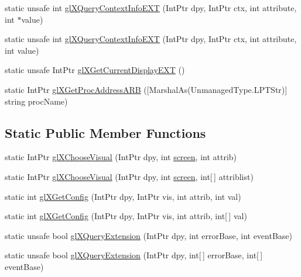 \begin{DoxyCompactItemize}
\item 
static unsafe int \hyperlink{class_tao_1_1_platform_1_1_x11_1_1_glx_ab41c548e80e5b611d2cb2cf574447384}{glXQueryContextInfoEXT} (IntPtr dpy, IntPtr ctx, int attribute, int $\ast$value)
\item 
static unsafe int \hyperlink{class_tao_1_1_platform_1_1_x11_1_1_glx_ab04a24929cd277bb67038a2908732831}{glXQueryContextInfoEXT} (IntPtr dpy, IntPtr ctx, int attribute, int value)
\item 
static unsafe IntPtr \hyperlink{class_tao_1_1_platform_1_1_x11_1_1_glx_a82ebe03bd0af65b1f9578d4386410757}{glXGetCurrentDisplayEXT} ()
\item 
static IntPtr \hyperlink{class_tao_1_1_platform_1_1_x11_1_1_glx_a4b0a79dfa8b18016eb5c75e6b5d45ffb}{glXGetProcAddressARB} (\mbox{[}MarshalAs(UnmanagedType.LPTStr)\mbox{]} string procName)
\end{DoxyCompactItemize}
\subsection*{Static Public Member Functions}
\begin{DoxyCompactItemize}
\item 
static IntPtr \hyperlink{class_tao_1_1_platform_1_1_x11_1_1_glx_af7dffb5839e4388cebb097f39757bd01}{glXChooseVisual} (IntPtr dpy, int \hyperlink{_sdl_8cs_a968bba55c7ad32b326939fefd1bbb017}{screen}, int attrib)
\item 
static IntPtr \hyperlink{class_tao_1_1_platform_1_1_x11_1_1_glx_ae4180f969acf816b2d834e579703a393}{glXChooseVisual} (IntPtr dpy, int \hyperlink{_sdl_8cs_a968bba55c7ad32b326939fefd1bbb017}{screen}, int\mbox{[}$\,$\mbox{]} attriblist)
\item 
static int \hyperlink{class_tao_1_1_platform_1_1_x11_1_1_glx_a68ae6615063a4c46a44b2a5269161c01}{glXGetConfig} (IntPtr dpy, IntPtr vis, int attrib, int val)
\item 
static int \hyperlink{class_tao_1_1_platform_1_1_x11_1_1_glx_a6f4c241561c9837d7fe96a61b5205d2a}{glXGetConfig} (IntPtr dpy, IntPtr vis, int attrib, int\mbox{[}$\,$\mbox{]} val)
\item 
static unsafe bool \hyperlink{class_tao_1_1_platform_1_1_x11_1_1_glx_a3cfc40650ed7ff135d4a3a8c9267843b}{glXQueryExtension} (IntPtr dpy, int errorBase, int eventBase)
\item 
static unsafe bool \hyperlink{class_tao_1_1_platform_1_1_x11_1_1_glx_a7b469f34db6f8a6df0a4424b723df753}{glXQueryExtension} (IntPtr dpy, int\mbox{[}$\,$\mbox{]} errorBase, int\mbox{[}$\,$\mbox{]} eventBase)
\end{DoxyCompactItemize}
